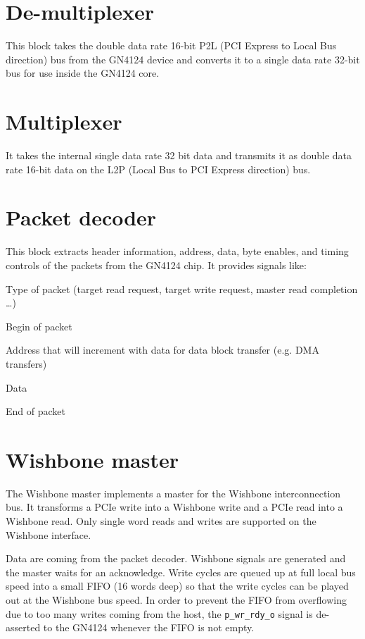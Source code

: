 \documentclass[10pt,a4paper]{cerndoc}
\begin{document}
  \section{De-multiplexer}
  This block takes the double data rate 16-bit P2L (PCI Express to Local Bus direction) bus from the GN4124 device and converts it to a single data rate 32-bit bus for use inside the GN4124 core.
  
  \section{Multiplexer}
  It takes the internal single data rate 32 bit data and transmits it as double data rate 16-bit data on the L2P (Local Bus to PCI Express direction) bus.
  
  \section{Packet decoder}
    This block extracts header information, address, data, byte enables, and timing controls of the packets from the GN4124 chip. It provides signals like:
    
    
\begin{packed_item}
  \item Type of packet (target read request, target write request, master read completion \dots) 
  \item Begin of packet  
  \item Address that will increment with data for data block transfer (e.g. DMA transfers)
  \item Data
  \item End of packet   
\end{packed_item}

\section{Wishbone master}
  The Wishbone master implements a master for the Wishbone interconnection bus. It transforms a PCIe write into a Wishbone write and a PCIe read into a Wishbone read. Only single word reads and writes are supported on the Wishbone interface. 
  
  Data are coming from the packet decoder. Wishbone signals are generated and the master waits for an acknowledge. Write cycles are queued up at full local bus speed into a small FIFO (16 words deep) so that the write cycles can be played out at the Wishbone bus speed. In order to prevent the FIFO from overflowing due to too many writes coming from the host, the \verb+p_wr_rdy_o+ signal is de-asserted to the GN4124 whenever the FIFO is not empty. 
  
\end{document}
